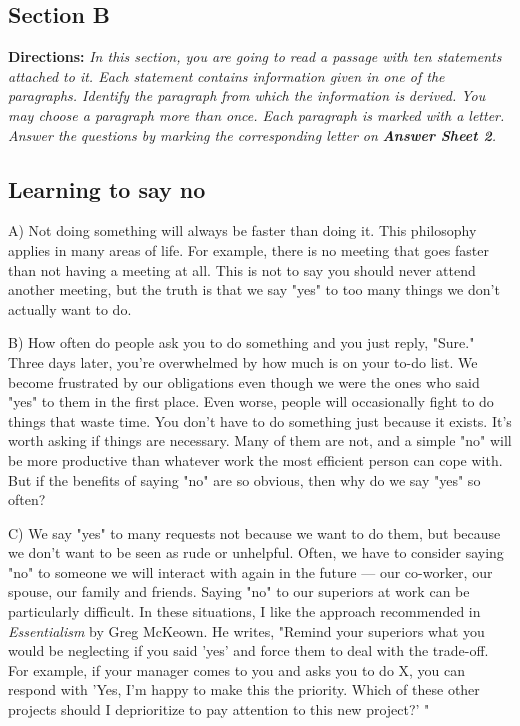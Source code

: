 \documentclass[UTF8,11pt]{ctexart}
\begin{document}
\subsection*{\textbf{Section B}}


\textbf{Directions:} \textit{In this section, you are going to read a passage with ten statements attached to it. Each statement} \textit{contains information given in one of the paragraphs. Identify the paragraph from which the information is} \textit{derived. You may choose a paragraph more than once. Each paragraph is marked with a letter. Answer the} \textit{questions by marking the corresponding letter on }\textbf{\textit{Answer Sheet 2}}\textit{.}


\subsection*{\textbf{Learning to say no}}


A) Not doing something will always be faster than doing it. This philosophy applies in many areas of life. For example, there is no meeting that goes faster than not having a meeting at all. This is not to say you should never attend another meeting, but the truth is that we say "yes" to too many things we don't actually want to do.


B) How often do people ask you to do something and you just reply, "Sure." Three days later, you're overwhelmed by how much is on your to-do list. We become frustrated by our obligations even though we were the ones who said "yes" to them in the first place. Even worse, people will occasionally fight to do things that waste time. You don't have to do something just because it exists. It's worth asking if things are necessary. Many of them are not, and a simple "no" will be more productive than whatever work the most efficient person can cope with. But if the benefits of saying "no" are so obvious, then why do we say "yes" so often?


C) We say "yes" to many requests not because we want to do them, but because we don't want to be seen as rude or unhelpful. Often, we have to consider saying "no" to someone we will interact with again in the future — our co-worker, our spouse, our family and friends. Saying "no" to our superiors at work can be particularly difficult. In these situations, I like the approach recommended in \textit{Essentialism} by Greg McKeown. He writes, "Remind your superiors what you would be neglecting if you said 'yes' and force them to deal with the trade-off. For example, if your manager comes to you and asks you to do X, you can respond with 'Yes, I'm happy to make this the priority. Which of these other projects should I deprioritize to pay attention to this new project?' "
\end{document}
